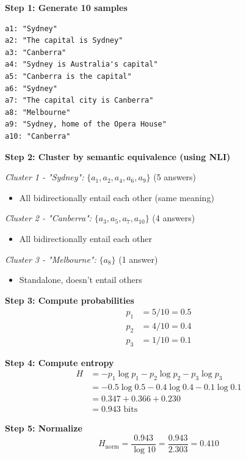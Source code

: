 \documentclass[12pt,a4paper]{article}
\theoremstyle{definition}
\begin{document}
\begin{examplebox}[title=Semantic Entropy on ``Capital of Australia'']

\textbf{Step 1: Generate 10 samples}
\begin{verbatim}
a1: "Sydney"
a2: "The capital is Sydney"
a3: "Canberra"
a4: "Sydney is Australia's capital"
a5: "Canberra is the capital"
a6: "Sydney"
a7: "The capital city is Canberra"
a8: "Melbourne"
a9: "Sydney, home of the Opera House"
a10: "Canberra"
\end{verbatim}

\textbf{Step 2: Cluster by semantic equivalence (using NLI)}

\textit{Cluster 1 - "Sydney":} $\{a_1, a_2, a_4, a_6, a_9\}$ (5 answers)
\begin{itemize}
    \item All bidirectionally entail each other (same meaning)
\end{itemize}

\textit{Cluster 2 - "Canberra":} $\{a_3, a_5, a_7, a_{10}\}$ (4 answers)
\begin{itemize}
    \item All bidirectionally entail each other
\end{itemize}

\textit{Cluster 3 - "Melbourne":} $\{a_8\}$ (1 answer)
\begin{itemize}
    \item Standalone, doesn't entail others
\end{itemize}

\textbf{Step 3: Compute probabilities}
\begin{align}
p_1 &= 5/10 = 0.5 \\
p_2 &= 4/10 = 0.4 \\
p_3 &= 1/10 = 0.1
\end{align}

\textbf{Step 4: Compute entropy}
\begin{align}
H &= -p_1 \log p_1 - p_2 \log p_2 - p_3 \log p_3 \\
&= -0.5 \log 0.5 - 0.4 \log 0.4 - 0.1 \log 0.1 \\
&= 0.347 + 0.366 + 0.230 \\
&= 0.943 \text{ bits}
\end{align}

\textbf{Step 5: Normalize}
\begin{equation}
H_{\text{norm}} = \frac{0.943}{\log 10} = \frac{0.943}{2.303} = 0.410
\end{equation}


\end{examplebox}
\end{document}
